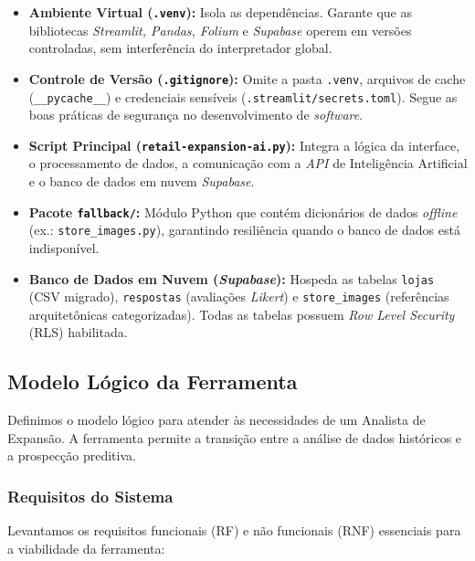 \begin{itemize}
    \item \textbf{Ambiente Virtual (\texttt{.venv}):} Isola as dependências. Garante que as bibliotecas \textit{Streamlit, Pandas, Folium} e \textit{Supabase} operem em versões controladas, sem interferência do interpretador global.
    \item \textbf{Controle de Versão (\texttt{.gitignore}):} Omite a pasta \texttt{.venv}, arquivos de cache (\texttt{\_\_pycache\_\_}) e credenciais sensíveis (\texttt{.streamlit/secrets.toml}). Segue as boas práticas de segurança no desenvolvimento de \textit{software}.
    \item \textbf{Script Principal (\texttt{retail-expansion-ai.py}):} Integra a lógica da interface, o processamento de dados, a comunicação com a \textit{API} de Inteligência Artificial e o banco de dados em nuvem \textit{Supabase}.
    \item \textbf{Pacote \texttt{fallback/}:} Módulo Python que contém dicionários de dados \textit{offline} (ex.: \texttt{store\_images.py}), garantindo resiliência quando o banco de dados está indisponível.
    \item \textbf{Banco de Dados em Nuvem (\textit{Supabase}):} Hospeda as tabelas \texttt{lojas} (CSV migrado), \texttt{respostas} (avaliações \textit{Likert}) e \texttt{store\_images} (referências arquitetônicas categorizadas). Todas as tabelas possuem \textit{Row Level Security} (RLS) habilitada.
\end{itemize}

\subsection{\esp Modelo Lógico da Ferramenta}

Definimos o modelo lógico para atender às necessidades de um Analista de Expansão. A ferramenta permite a transição entre a análise de dados históricos e a prospecção preditiva.

\subsubsection{\esp Requisitos do Sistema}

Levantamos os requisitos funcionais (RF) e não funcionais (RNF) essenciais para a viabilidade da ferramenta:


